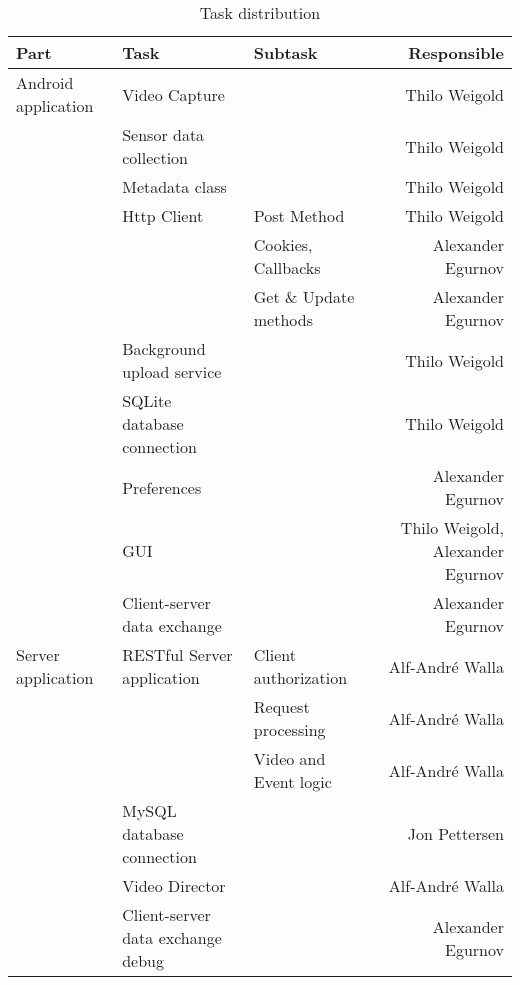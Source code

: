 \documentclass[conference]{IEEEtran}
\begin{document}



%


\begin{table*}[t]
	\centering
	\renewcommand{\arraystretch}{1.5}
	\caption{Task distribution}
	\label{tab:task_distr}
	\begin{tabular}{lllr}
		\toprule
		Part & Task  & Subtask & Responsible \\
		\midrule
		Android application 
			& Video Capture &       & Thilo Weigold \\
			& Sensor data collection &       & Thilo Weigold \\
			& Metadata class &       & Thilo Weigold \\
			& Http Client & Post Method & Thilo Weigold \\
			&       & Cookies, Callbacks & Alexander Egurnov \\
			&       & Get \& Update methods & Alexander Egurnov \\
			& Background upload service  &       & Thilo Weigold \\
			& SQLite database connection &       & Thilo Weigold \\
			& Preferences &       & Alexander Egurnov \\
			& GUI   &       & Thilo Weigold, Alexander Egurnov \\
			& Client-server data exchange &       & Alexander Egurnov \\
		\midrule
			Server application 
			& RESTful Server application & Client authorization & Alf-André Walla \\
			&       & Request processing & Alf-André Walla \\
			&       & Video and Event logic & Alf-André Walla \\
			& MySQL database connection &       & Jon Pettersen \\
			& Video Director  &       & Alf-André Walla \\
			& Client-server data exchange debug &       & Alexander Egurnov \\

\end{tabular}
\end{table*}
\end{document}
